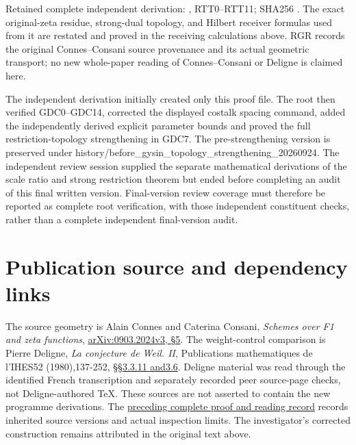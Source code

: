 Retained complete independent derivation:
\href{https://github.com/KokunoYumeto/zeta-function-research-reader/blob/36a82ecca98addb8a98b48204e349737856c7223/workbenches/splitzero-tandem/continuations/20260924-cohomology-weight-and-character-lifts/gct-weight-control/proofs/RESIDUE_TRACE_TRANSFER_INDEPENDENT.md}{},
RTT0--RTT11; SHA256
.
The exact original-zeta residue, strong-dual topology, and Hilbert
receiver formulas used from it are restated and proved in the receiving
calculations above. RGR records the original Connes--Consani source
provenance and its actual geometric transport; no new whole-paper
reading of Connes--Consani or Deligne is claimed here.

The independent derivation initially created only this proof file. The
root then verified GDC0--GDC14, corrected the displayed costalk spacing
command, added the independently derived explicit parameter bounds and
proved the full restriction-topology strengthening in GDC7. The
pre-strengthening version is preserved under
history/before\_gysin\_topology\_strengthening\_20260924. The
independent review session supplied the separate mathematical
derivations of the scale ratio and strong restriction theorem but ended
before completing an audit of this final written version. Final-version
review coverage must therefore be reported as complete root
verification, with those independent constituent checks, rather than a
complete independent final-version audit.

\section{Publication source and dependency
links}\label{publication-source-and-dependency-links}

The source geometry is Alain Connes and Caterina Consani, \emph{Schemes
over F1 and zeta functions},
\href{https://arxiv.org/abs/0903.2024v3}{arXiv:0903.2024v3, §5}. The
weight-control comparison is Pierre Deligne, \emph{La conjecture de
Weil. II}, Publications mathematiques de l'IHES52 (1980),137-252,
\href{https://www.numdam.org/item/PMIHES_1980__52__137_0/}{§§3.3.11
and3.6}. Deligne material was read through the identified French
transcription and separately recorded peer source-page checks, not
Deligne-authored TeX. These sources are not asserted to contain the new
programme derivations. The
\href{https://github.com/KokunoYumeto/zeta-function-research-reader/blob/36a82ecca98addb8a98b48204e349737856c7223/workbenches/splitzero-tandem/continuations/20260924-cohomology-weight-and-character-lifts/BUILD_AND_REVIEW.md}{preceding
complete proof and reading record} records inherited source versions and
actual inspection limits. The investigator's corrected construction
remains attributed in the original text above.


